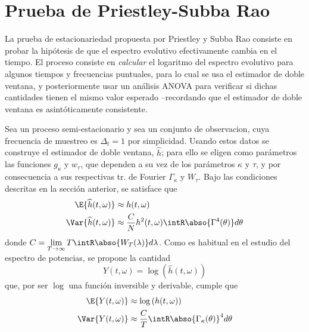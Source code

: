 
\section{Prueba de Priestley-Subba Rao}
\label{sec:psr}

La prueba de estacionariedad propuesta por Priestley y Subba Rao \cite{Priestley69} consiste en 
probar la hipótesis de que el espectro evolutivo efectivamente cambia en el tiempo. 
%
El proceso consiste en \textit{calcular} el logaritmo del espectro evolutivo para algunos tiempos y 
frecuencias puntuales, para lo cual se usa el estimador de doble ventana, y posteriormente usar un
análisis ANOVA para verificar si dichas cantidades tienen el mismo valor esperado --recordando que
el estimador de doble ventana es asintóticamente consistente.

Sea \xt un proceso semi-estacionario y sea \xtd un conjunto de observacion, cuya frecuencia de 
muestreo es $\Delta_t=1$ por simplicidad.
%
Usando estos datos se construye el estimador de doble ventana, $\widehat{h}$; para ello se eligen 
como parámetros las funciones $g_\kappa$ y $w_\tau$, que dependen a su vez de los parámetros 
$\kappa$ y $\tau$, y por consecuencia a sus respectivas tr. de Fourier $\Gamma_\kappa$ y $W_\tau$.
%
Bajo las condiciones descritas en la sección anterior, se satisface que
%
\begin{align*}
\E{\widehat{h}(t,\omega)} &\approx h(t,\omega) \\
\Var{\widehat{h}(t,\omega)} &\approx 
\frac{C}{N} h^{2}(t,\omega) \intR \abso{\Gamma^{4}(\theta)} d\theta
\end{align*}
%
donde $\displaystyle C = \lim_{T\rightarrow \infty} T \intR \abso{W_T(\lambda)} d\lambda$.
%
Como es habitual en el estudio del espectro de potencias, se propone la cantidad 
\begin{equation}
Y(t,\omega) = \log\left(\widehat{h}(t,\omega)\right)
\end{equation}
que, por ser $\log$ una función inversible y derivable, cumple que
%
\begin{align*}
\E{Y(t,\omega)} &\approx \log\left(h(t,\omega)\right) \\
\Var{Y(t,\omega)} &\approx 
\frac{C}{T} \intR \abso{\Gamma_\kappa(\theta)}^{4} d\theta \\
\end{align*}


